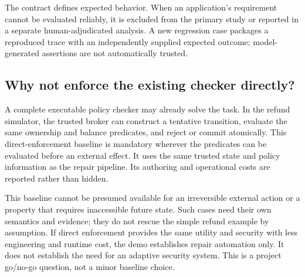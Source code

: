 \documentclass[11pt,a4paper]{article}
\begin{document}
The contract defines expected behavior. When an application's requirement cannot be evaluated reliably, it is excluded from the primary study or reported in a separate human-adjudicated analysis. A new regression case packages a reproduced trace with an independently supplied expected outcome; model-generated assertions are not automatically trusted.

\subsection{Why not enforce the existing checker directly?}
A complete executable policy checker may already solve the task. In the refund simulator, the trusted broker can construct a tentative transition, evaluate the same ownership and balance predicates, and reject or commit atomically. This direct-enforcement baseline is mandatory wherever the predicates can be evaluated before an external effect. It uses the same trusted state and policy information as the repair pipeline. Its authoring and operational costs are reported rather than hidden.

This baseline cannot be presumed available for an irreversible external action or a property that requires inaccessible future state. Such cases need their own semantics and evidence; they do not rescue the simple refund example by assumption. If direct enforcement provides the same utility and security with less engineering and runtime cost, the demo establishes repair automation only. It does not establish the need for an adaptive security system. This is a project go/no-go question, not a minor baseline choice.
\end{document}
